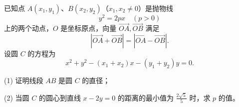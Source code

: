\begin{question}
已知点 \(A(x_1,y_1)\)、\(B(x_2,y_2)\)（\(x_1,x_2\ne0\)）是抛物线
\nopagebreak[4]
\[
y^2=2px\quad(p>0)
\]
上的两个动点，\(O\) 是坐标原点，向量 \(\overrightarrow{OA},\overrightarrow{OB}\) 满足
\nopagebreak[4]
\[
\left|\overrightarrow{OA}+\overrightarrow{OB}\right|=
\left|\overrightarrow{OA}-\overrightarrow{OB}\right|.
\]
设圆 \(C\) 的方程为
\nopagebreak[4]
\[
x^2+y^2-(x_1+x_2)x-(y_1+y_2)y=0.
\]

(1) 证明线段 \(AB\) 是圆 \(C\) 的直径；

(2) 当圆 \(C\) 的圆心到直线 \(x-2y=0\) 的距离的最小值为 \(\frac{2\sqrt5}{5}\) 时，求 \(p\) 的值。

\end{question}